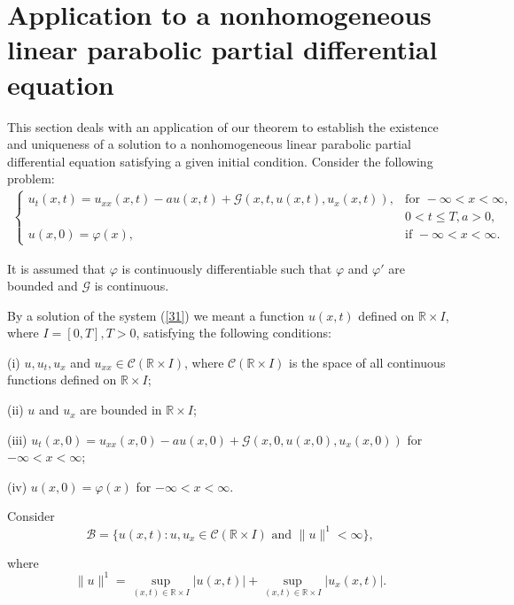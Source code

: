 \documentclass[11pt,reqno,a4paper]{amsart}
\theoremstyle{plain}
\theoremstyle{definition}
\theoremstyle{remark}
\numberwithin{equation}{section}
\begin{document}


\section{Application to a nonhomogeneous linear parabolic partial differential equation}

This section deals with an application of our theorem to establish the existence and uniqueness of a solution to a nonhomogeneous linear parabolic partial differential equation satisfying a given initial condition. Consider the following problem:
\begin{align}\label{31}
\begin{cases}
u_t(x,t)=u_{xx}(x,t)-a u(x,t)+\mathcal{G}(x,t,u(x,t),u_x(x,t)), & \text{for } 
-\infty<x<\infty,  \\
&0<t\le T, a>0,  \\
u(x,0)=\varphi(x), & \text{if } -\infty<x<\infty.
\end{cases}
\end{align}

It is assumed that $\varphi$ is continuously differentiable such that $\varphi$ and $\varphi'$ are bounded and $\mathcal{G}$ is continuous. 

By a solution of the system (\ref{31}) we meant a function $u(x,t)$ defined on $\mathbb{R}\times I$, where $I=[0,T], T>0$, satisfying the following conditions:

(i) $u,u_t,u_x$ and $u_{xx}\in \mathcal{C}(\mathbb{R}\times I)$, where $\mathcal{C}(\mathbb{R}\times I)$ is the space of all continuous functions defined on $\mathbb{R}\times I$;

(ii) $u$ and $u_x$ are bounded in $\mathbb{R}\times I$;

(iii) $u_t(x,0)=u_{xx}(x,0)-a u(x,0)+\mathcal{G}(x,0,u(x,0),u_x(x,0))$ for $-\infty<x<\infty$;

(iv) $u(x,0)=\varphi(x)$ for $-\infty<x<\infty$.

Consider $$ \mathcal{B}=\{u(x,t):u,u_x\in \mathcal{C}(\mathbb{R}\times I)\text{ and }\|u\|^1<\infty\}, $$

where $$\|u\|^1=\sup_{(x,t)\in \mathbb{R}\times I}|u(x,t)|+\sup_{(x,t)\in \mathbb{R}\times I}|u_x(x,t)|. $$
\end{document}
